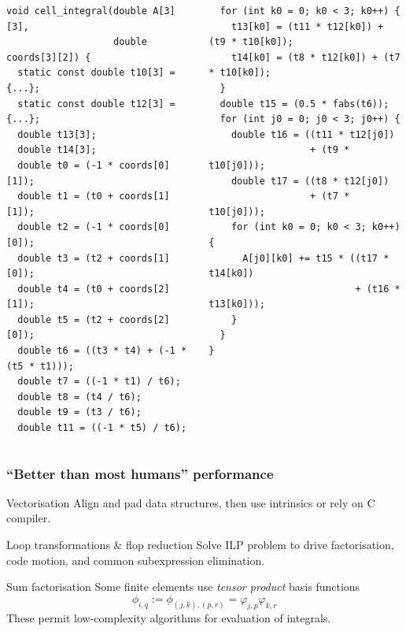 \documentclass[presentation, 10pt]{beamer}
\begin{document}
\begin{frame}[fragile]
\begin{overlayarea}{\textwidth}{0.8\textheight}
\begin{onlyenv}
    \begin{columns}
      \begin{column}{0.5\textwidth}
\begin{verbatim}
void cell_integral(double A[3][3],
                   double coords[3][2]) {
  static const double t10[3] = {...};
  static const double t12[3] = {...};
  double t13[3];
  double t14[3];
  double t0 = (-1 * coords[0][1]);
  double t1 = (t0 + coords[1][1]);
  double t2 = (-1 * coords[0][0]);
  double t3 = (t2 + coords[1][0]);
  double t4 = (t0 + coords[2][1]);
  double t5 = (t2 + coords[2][0]);
  double t6 = ((t3 * t4) + (-1 * (t5 * t1)));
  double t7 = ((-1 * t1) / t6);
  double t8 = (t4 / t6);
  double t9 = (t3 / t6);
  double t11 = ((-1 * t5) / t6);
\end{verbatim}
      \end{column}
      \begin{column}{0.5\textwidth}
\begin{verbatim}
  for (int k0 = 0; k0 < 3; k0++) {
    t13[k0] = (t11 * t12[k0]) + (t9 * t10[k0]);
    t14[k0] = (t8 * t12[k0]) + (t7 * t10[k0]);
  }
  double t15 = (0.5 * fabs(t6));
  for (int j0 = 0; j0 < 3; j0++) {
    double t16 = ((t11 * t12[j0])
                  + (t9 * t10[j0]));
    double t17 = ((t8 * t12[j0])
                  + (t7 * t10[j0]));
    for (int k0 = 0; k0 < 3; k0++) {
      A[j0][k0] += t15 * ((t17 * t14[k0])
                          + (t16 * t13[k0]));
    }
  }
}
\end{verbatim}
      \end{column}
    \end{columns}
  \end{onlyenv}
  \end{overlayarea}
\end{frame}

\begin{frame}
  \frametitle{``Better than most humans'' performance}
  \begin{block}{Vectorisation}
    Align and pad data structures, then use intrinsics or rely on C
    compiler.
  \end{block}

  \begin{block}{Loop transformations \& flop reduction}
    Solve ILP problem to drive factorisation, code motion, and common
    subexpression elimination.
  \end{block}

  \begin{block}{Sum factorisation}
    Some finite elements use \emph{tensor product} basis functions
    \begin{equation*}
      \phi_{i,q} := \phi_{(j,k),(p,r)} = \varphi_{j,p}\varphi_{k,r}
    \end{equation*}
    These permit low-complexity algorithms for evaluation of integrals.
  \end{block}
\end{frame}
\end{document}
